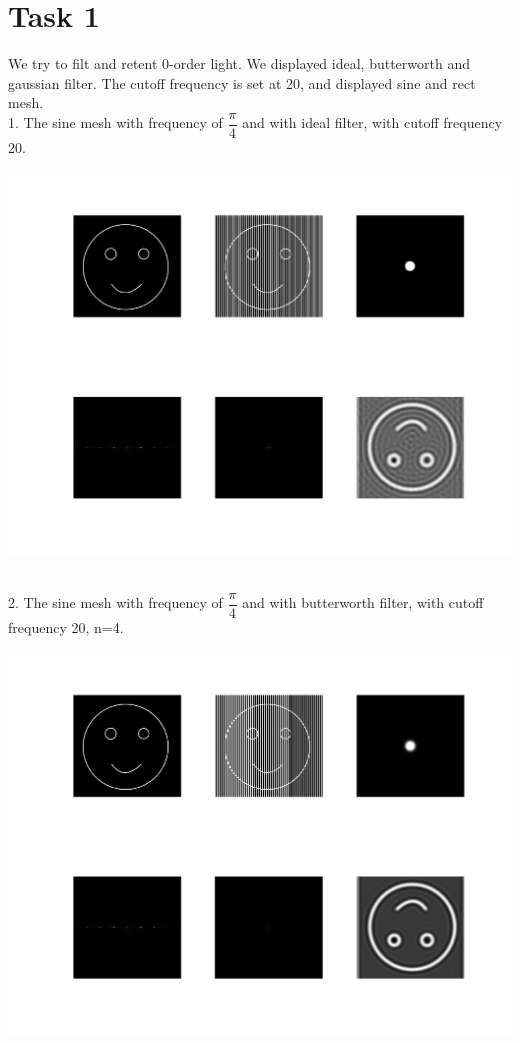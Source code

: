 \documentclass[a4paper]{article}
\begin{document}
\section{Task 1}
We try to filt and retent 0-order light. We displayed ideal, butterworth and gaussian filter.
The cutoff frequency is set at 20, and displayed sine and rect mesh.\\
1. The sine mesh with frequency of $\dfrac{\pi}{4}$ and with ideal filter, with cutoff frequency 20.\\
\centerline{\includegraphics[scale=0.275]{1.jpg}}\\
2. The sine mesh with frequency of $\dfrac{\pi}{4}$ and with butterworth filter, with cutoff frequency 20, n=4.\\
\centerline{\includegraphics[scale=0.30]{2.jpg}}\\
\end{document}
